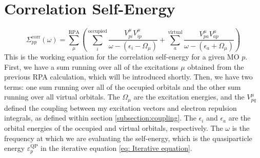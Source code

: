 \documentclass[12pt]{caltech_thesis}
\begin{document}
\section{Correlation Self-Energy}
\label{sec:correlation_self_energy}
\begin{equation}
    \Sigma_{pp}^{\text{corr}}(\omega) = \sum_{\mu }^{\text{RPA}}\left(\sum_{i}^{\text{occupied}} \frac{V_{pi}^{\mu }V_{ip}^{\mu }}{\omega -(\epsilon _{i}-\Omega  _{\mu })}+ \sum_{a}^{\text{virtual}} \frac{V_{pa}^{\mu }V_{ap}^{\mu }}{\omega -(\epsilon _{a}+\Omega  _{\mu })}\right)
\end{equation}
This is the working equation for the correlation self-energy for a given MO $p$. First, we have a sum running over all of the excitations $\mu$ obtained from the previous RPA calculation, which will be introduced shortly. Then, we have two terms: one sum running over all of the occupied orbitals and the other sum running over all virtual orbitals. The $\Omega _{\mu }$ are the excitation energies, and the $V_{pq}^{\mu }$ defined the coupling between my excitation vectors and electron repulsion integrals, as defined within section \ref{subsection:coupling}. The $\epsilon _{i}$ and $\epsilon _{a}$ are the orbital energies of the occupied and virtual orbitals, respectively. The $\omega$ is the frequency at which we are evaluating the self-energy, which is the quasiparticle energy $\varepsilon_{p}^{\text{QP}}$ in the iterative equation \ref{eq: Iterative equation}.
\end{document}

